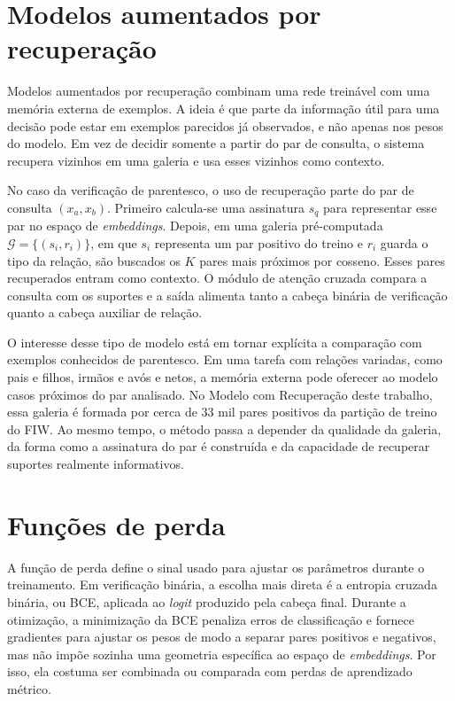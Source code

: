 \section{Modelos aumentados por recuperação}

Modelos aumentados por recuperação combinam uma rede treinável com uma memória externa de exemplos. A ideia é que parte da informação útil para uma decisão pode estar em exemplos parecidos já observados, e não apenas nos pesos do modelo. Em vez de decidir somente a partir do par de consulta, o sistema recupera vizinhos em uma galeria e usa esses vizinhos como contexto.

No caso da verificação de parentesco, o uso de recuperação parte do par de consulta $(x_a, x_b)$. Primeiro calcula-se uma assinatura $s_q$ para representar esse par no espaço de \textit{embeddings}. Depois, em uma galeria pré-computada $\mathcal{G} = \{(s_i, r_i)\}$, em que $s_i$ representa um par positivo do treino e $r_i$ guarda o tipo da relação, são buscados os $K$ pares mais próximos por cosseno. Esses pares recuperados entram como contexto. O módulo de atenção cruzada compara a consulta com os suportes e a saída alimenta tanto a cabeça binária de verificação quanto a cabeça auxiliar de relação.

O interesse desse tipo de modelo está em tornar explícita a comparação com exemplos conhecidos de parentesco. Em uma tarefa com relações variadas, como pais e filhos, irmãos e avós e netos, a memória externa pode oferecer ao modelo casos próximos do par analisado. No Modelo com Recuperação deste trabalho, essa galeria é formada por cerca de 33 mil pares positivos da partição de treino do FIW. Ao mesmo tempo, o método passa a depender da qualidade da galeria, da forma como a assinatura do par é construída e da capacidade de recuperar suportes realmente informativos.

\section{Funções de perda}

A função de perda define o sinal usado para ajustar os parâmetros durante o treinamento. Em verificação binária, a escolha mais direta é a entropia cruzada binária, ou BCE, aplicada ao \textit{logit} produzido pela cabeça final. Durante a otimização, a minimização da BCE penaliza erros de classificação e fornece gradientes para ajustar os pesos de modo a separar pares positivos e negativos, mas não impõe sozinha uma geometria específica ao espaço de \textit{embeddings}. Por isso, ela costuma ser combinada ou comparada com perdas de aprendizado métrico.

